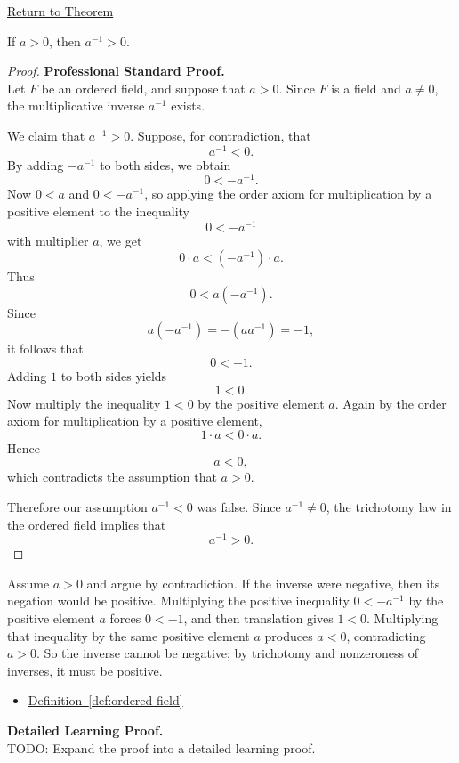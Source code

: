 \newpage
{}
\label{prf:inverse-positive}

\begin{remark*}[Return]
\hyperref[thm:inverse-positive]{Return to Theorem}
\end{remark*}

\begin{theorem*}
If $a>0$, then $a^{-1}>0$.
\end{theorem*}

\begin{proof}
\textbf{Professional Standard Proof.}~\\
Let $F$ be an ordered field, and suppose that $a>0$.  Since $F$ is a field
and $a\neq 0$, the multiplicative inverse $a^{-1}$ exists.

We claim that $a^{-1}>0$.  Suppose, for contradiction, that
\[
a^{-1}<0.
\]
By adding $-a^{-1}$ to both sides, we obtain
\[
0<-a^{-1}.
\]
Now $0<a$ and $0<-a^{-1}$, so applying the order axiom for multiplication by
a positive element to the inequality
\[
0<-a^{-1}
\]
with multiplier $a$, we get
\[
0\cdot a<(-a^{-1})\cdot a.
\]
Thus
\[
0<a(-a^{-1}).
\]
Since
\[
a(-a^{-1})=-(aa^{-1})=-1,
\]
it follows that
\[
0<-1.
\]
Adding $1$ to both sides yields
\[
1<0.
\]
Now multiply the inequality $1<0$ by the positive element $a$.  Again by the
order axiom for multiplication by a positive element,
\[
1\cdot a<0\cdot a.
\]
Hence
\[
a<0,
\]
which contradicts the assumption that $a>0$.

Therefore our assumption $a^{-1}<0$ was false.  Since $a^{-1}\neq 0$, the
trichotomy law in the ordered field implies that
\[
a^{-1}>0.
\]
\end{proof}

\begin{remark*}
Assume $a>0$ and argue by contradiction.  If the inverse were negative, then
its negation would be positive.  Multiplying the positive inequality
$0<-a^{-1}$ by the positive element $a$ forces $0<-1$, and then translation
gives $1<0$.  Multiplying that inequality by the same positive element $a$
produces $a<0$, contradicting $a>0$.  So the inverse cannot be negative; by
trichotomy and nonzeroness of inverses, it must be positive.
\end{remark*}

\begin{dependencies}
\begin{itemize}
  \item \hyperref[def:ordered-field]{Definition~\ref*{def:ordered-field}}
\end{itemize}
\end{dependencies}

\textbf{Detailed Learning Proof.}~\\
TODO: Expand the proof into a detailed learning proof.

